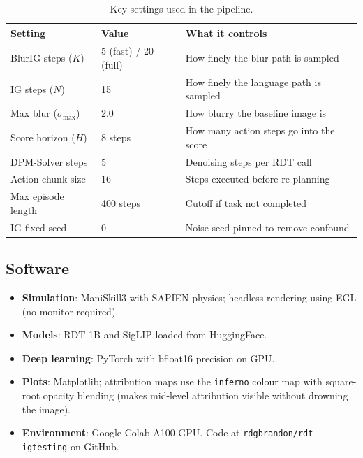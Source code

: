 \documentclass[11pt,a4paper]{article}
\begin{document}
\begin{table}[h]
\centering
\caption{Key settings used in the pipeline.}
\label{tab:hyperparams}
\begin{tabular}{lll}
\toprule
\textbf{Setting} & \textbf{Value} & \textbf{What it controls} \\
\midrule
BlurIG steps ($K$)      & 5 (fast) / 20 (full) & How finely the blur path is sampled \\
IG steps ($N$)           & 15                   & How finely the language path is sampled \\
Max blur ($\sigma_{\max}$) & 2.0               & How blurry the baseline image is \\
Score horizon ($H$)      & 8 steps              & How many action steps go into the score \\
DPM-Solver steps         & 5                    & Denoising steps per RDT call \\
Action chunk size        & 16                   & Steps executed before re-planning \\
Max episode length       & 400 steps            & Cutoff if task not completed \\
IG fixed seed            & 0                    & Noise seed pinned to remove confound \\
\bottomrule
\end{tabular}
\end{table}

\subsection{Software}

\begin{itemize}
    \item \textbf{Simulation}: ManiSkill3 with SAPIEN physics; headless
          rendering using EGL (no monitor required).
    \item \textbf{Models}: RDT-1B and SigLIP loaded from HuggingFace.
    \item \textbf{Deep learning}: PyTorch with bfloat16 precision on GPU.
    \item \textbf{Plots}: Matplotlib; attribution maps use the
          \texttt{inferno} colour map with square-root opacity blending
          (makes mid-level attribution visible without drowning the image).
    \item \textbf{Environment}: Google Colab A100 GPU. Code at
          \texttt{rdgbrandon/rdt-igtesting} on GitHub.
\end{itemize}
\end{document}
